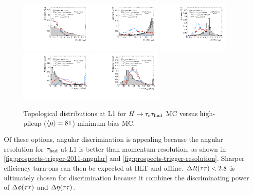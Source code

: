 \begin{figure}[tp]
  \centering
  \includegraphics[width=0.32\textwidth]{figures/l1topo/taulep-deta}
  \includegraphics[width=0.32\textwidth]{figures/l1topo/taulep-dphi}
  \includegraphics[width=0.32\textwidth]{figures/l1topo/taulep-dR}
  \includegraphics[width=0.32\textwidth]{figures/l1topo/ditau-pt}
  \includegraphics[width=0.32\textwidth]{figures/l1topo/ditau-m}
  \caption{Topological distributions at L1 for $H\rightarrow\tau_e \tau_\text{had}$ MC versus high-pileup ($\langle\mu\rangle=81$) minimum bias MC.}
  \label{fig:prospects-trigger-l1topo}
\end{figure}

Of these options, angular discrimination is appealing because the angular resolution for $\tau_\text{had}$ at L1 is better than momentum resolution, as shown in \cref{fig:prospects-trigger-2011-angular} and \cref{fig:prospects-trigger-resolution}. Sharper efficiency turn-ons can then be expected at HLT and offline. $\Delta R(\tau\tau) < 2.8$ is ultimately chosen for discrimination because it combines the discriminating power of $\Delta\phi(\tau\tau)$ and $\Delta\eta(\tautau)$.

